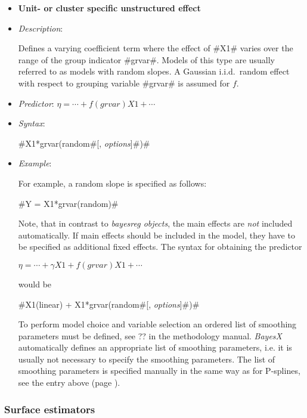 \begin{itemize}
\item[]{\bf\sffamily Unit- or cluster specific unstructured
effect}

\item[] {\em Description}:

Defines a varying coefficient term where the effect of #X1# varies
over the range of the group indicator #grvar#. Models of this type
are usually referred to as models with random slopes. A Gaussian
i.i.d.~random effect with respect to grouping variable #grvar# is
assumed for $f$.
\item[] {\em Predictor}: $\eta = \cdots + f(grvar)X1 + \cdots$
\item[] {\em Syntax}:

#X1*grvar(random#[, {\em options}]#)#
\item[] {\em Example}:

For example, a random slope is specified as follows:

#Y = X1*grvar(random)#

Note, that in contrast to {\em bayesreg objects}, the main effects
are {\em not} included automatically. If main effects should be
included in the model, they have to be specified as additional
fixed effects. The syntax for obtaining the predictor

$\eta = \cdots + \gamma X1 + f(grvar)X1 + \cdots$

would be

#X1(linear) + X1*grvar(random#[, {\em options}]#)#

To perform model choice and variable selection an ordered list of smoothing parameters must be defined, see ??
in the methodology manual. {\em BayesX} automatically defines an appropriate list of smoothing parameters, i.e. it
is usually not necessary to  specify the smoothing parameters.
The list of smoothing parameters is specified manually in the same way as for P-splines,
see the entry above (page \pageref{psplines_stepwise}).
\end{itemize}

\subsubsection*{Surface estimators}

